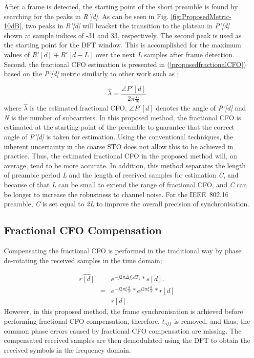 After a frame is detected, the starting point of the short preamble is found by searching for the peaks in \emph{R'[d]}.
As can be seen in Fig. \ref{fig:ProposedMetric-10dB}, two peaks in \emph{R'[d]} will bracket the transition to the plateau in \emph{P'[d]} shown at sample indices of -31 and 33, respectively.
The second peak is used as the starting point for the DFT window.
This is accomplished for the maximum values of $R'[d] + R'[d - L]$ over the next \emph{L} samples after frame detection.
Second, the fractional CFO estimation is presented in (\ref{proposedfractionalCFO}) based on the \emph{P'[d]} metric similarly to other work such as \cite{Schmidl1997,Schwoerer2002,Manavi2004,Guffey2007,Huang2010,Recio2010};

\begin{equation}
\label{proposedfractionalCFO}
\hat{\lambda} = \frac{\angle P'[d]}{2\pi \frac{L}{N}}
\end{equation}
where $\hat{\lambda}$ is the estimated fractional CFO, $\angle P'[d]$ denotes the angle of \emph{P'[d]} and \emph{N} is the number of subcarriers.
In this proposed method, the fractional CFO is estimated at the starting point of the preamble to guarantee that the correct angle of \emph{P'[d]} is taken for estimation. Using the conventional techniques, the inherent uncertainty in the coarse STO does not allow this to be achieved in practice.
Thus, the estimated fractional CFO in the proposed method will, on average, tend to be more accurate.
In addition, this method separates the length of preamble period \emph{L} and the length of received samples for estimation \emph{C}, and because of that \emph{L} can be small to extend the range of fractional CFO, and \emph{C} can be longer to increase the robustness to channel noise. For the IEEE~802.16 preamble, \emph{C} is set equal to \emph{2L} to improve the overall precision of synchronisation.

\subsection{Fractional CFO Compensation}

Compensating the fractional CFO is performed in the traditional way by phase de-rotating the received samples in the time domain;

\begin{eqnarray}
\label{proposedcomfreoffsignal}
\widehat{r[d]} &=&  e^{-j2\pi\Delta f_{c}dT_{s}}*s[d]. \nonumber \\
&=&  e^{-j2\pi\xi \frac{d}{N}}*e^{j2\pi\xi \frac{d}{N}}*r[d] \nonumber \\
&=& r[d].
\end{eqnarray}
However, in this proposed method, the frame synchronisation is achieved before performing fractional CFO compensation, therefore, $t_{off}$ is removed, and thus, the common phase errors caused by fractional CFO compensation are missing.
The compensated received samples are then demodulated using the DFT to obtain the received symbols in the frequency domain.

